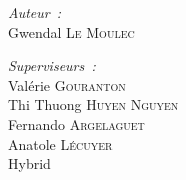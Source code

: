 \documentclass[11pt]{article}
\begin{document}
\begin{titlepage}
\begin{center}
\begin{comment}
Technology for Human Learning 
Artificial Intelligence 
Computer Arithmetic
Hardware Architecture
Automatic Control Engineering
Bioinformatics 
Biotechnology
Computational Complexity 
Computational Engineering, Finance, and Science
Computational Geometry 
Computation and Language 
Cryptography and Security 
Computer Vision and Pattern Recognition
Computers and Society 
Databases 
Distributed, Parallel, and Cluster Computing 
Digital Libraries
Discrete Mathematics 
Data Structures and Algorithms 
Embedded Systems 
Emerging Technologies 
Formal Languages and Automata Theory 
General Literature 
Graphics 
Computer Science and Game Theory 
Human-Computer Interaction 
Computer Aided Engineering 
Medical Imaging 
Information Retrieval 
Information Theory 
Ubiquitous Computing 
Machine Learning
Logic in Computer Science 
Multiagent Systems 
Mobile Computing
Multimedia
Modeling and Simulation 
Mathematical Software 
Numerical Analysis 
Neural and Evolutionary Computing 
Networking and Internet Architecture 
Operating Systems 
Performance 
Programming Languages 
Robotics 
Operations Research
Symbolic Computation 
Sound
Software Engineering 
Social and Information Networks 
Systems and Control 
Image Processing 
Signal and Image Processing 
Document and Text Processing
Web
\end{comment}
%
\begin{minipage}{0.4\textwidth}
\begin{flushleft} \large
\emph{Auteur~:}\\
Gwendal  \textsc{Le Moulec}
\end{flushleft}
\end{minipage}
\begin{minipage}{0.4\textwidth}
\begin{flushright} \large
\emph{Superviseurs~:} \\
%
Valérie \textsc{Gouranton } \\
Thi Thuong \textsc{Huyen Nguyen } \\
Fernando \textsc{Argelaguet}\\
Anatole \textsc{L\'ecuyer}\\
Hybrid
\end{flushright}
\end{minipage}

\vfill



\end{center}
\end{titlepage}
\end{document}
